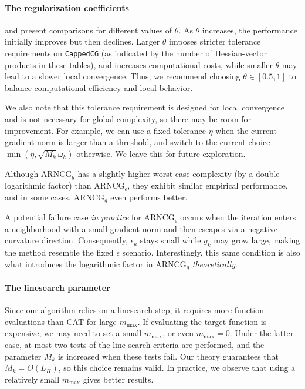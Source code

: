 \paragraph{The regularization coefficients}
 and  present comparisons for different values of $\theta$.  
As $\theta$ increases, the performance initially improves but then declines.
Larger $\theta$ imposes stricter tolerance requirements on \texttt{CappedCG} (as indicated by the number of Hessian-vector products in these tables), 
and increases computational costs,
while smaller $\theta$ may lead to a slower local convergence.
Thus, we recommend choosing $\theta \in [0.5, 1]$ to balance computational efficiency and local behavior.

We also note that this tolerance requirement is designed for local convergence and is not necessary for global complexity,
so there may be room for improvement.
For example, we can use a fixed tolerance $\eta$ when the current gradient norm is larger than a threshold, and switch to the current choice $\min( \eta, \sqrt{M_k} \omega_k)$ otherwise.
We leave this for future exploration.

Although ARNCG$_g$ has a slightly higher worst-case complexity (by a double-logarithmic factor) than ARNCG$_\epsilon$, 
they exhibit similar empirical performance, and in some cases, ARNCG$_g$ even performs better.  

A potential failure case \emph{in practice} for ARNCG$_\epsilon$ occurs when the iteration enters a neighborhood with a small gradient norm and then escapes via a negative curvature direction.  
Consequently, $\epsilon_k$ stays small while $g_k$ may grow large, making the method resemble the fixed $\epsilon$ scenario.  
Interestingly, 
this same condition is also what introduces the logarithmic factor in
ARNCG$_g$ \emph{theoretically}.

\paragraph{The linesearch parameter}
Since our algorithm relies on a linesearch step, it requires more function evaluations than CAT for large $m_{\mathrm{max}}$.  
If evaluating the target function is expensive, we may need to set a small $m_{\mathrm{max}}$, or even $m_{\mathrm{max}} = 0$.  
Under the latter case, at most two tests of the line search criteria are performed, and the parameter $M_k$ is increased when these tests fail.  
Our theory guarantees that $M_k = O(L_H)$, so this choice remains valid.  
In practice, we observe that using a relatively small $m_{\mathrm{max}}$ gives better results.




